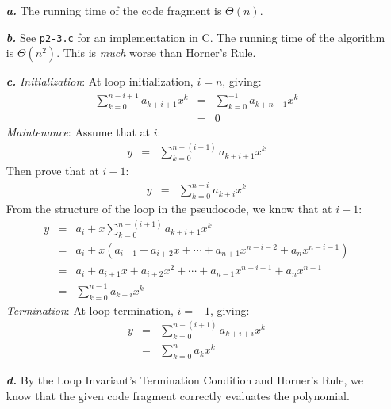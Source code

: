 \noindent\begin{enumerate}
	\item[\textbf{\textit{a.}}]
		The running time of the code fragment is $\Theta(n)$.

	\item[\textbf{\textit{b.}}]
		See \texttt{p2-3.c} for an implementation in C. The running time of the algorithm is $\Theta(n^2)$. This is \textit{much} worse than Horner's Rule.

	\item[\textbf{\textit{c.}}]
		\textit{Initialization}: At loop initialization, $i=n$, giving:
		\begin{eqnarray*}
			\sum_{k=0}^{n-i+1} a_{k+i+1} x^k & = & \sum_{k=0}^{-1} a_{k+n+1} x^k \\
			& = & 0
		\end{eqnarray*}
		\textit{Maintenance}: Assume that at $i$:
		\begin{eqnarray*}
			y & = & \sum_{k=0}^{n-(i+1)} a_{k+i+1} x^k
		\end{eqnarray*}
		Then prove that at $i-1$:
		\begin{eqnarray*}
			y & = & \sum_{k=0}^{n-i} a_{k+i} x^k
		\end{eqnarray*}
		From the structure of the loop in the pseudocode, we know that at $i-1$:
		\begin{eqnarray*}
			y & = & a_i + x \sum_{k=0}^{n-(i+1)} a_{k+i+1} x^k \\
			& = & a_i + x \left ( a_{i+1} + a_{i+2} x + \cdots + a_{n+1} x^{n-i-2} + a_n x^{n-i-1} \right ) \\
			& = & a_i + a_{i+1} x + a_{i+2} x^2 + \cdots + a_{n-1} x^{n-i-1} + a_n x^{n-1} \\
			& = & \sum_{k=0}^{n-1} a_{k+i} x^k
		\end{eqnarray*}
		\textit{Termination}: At loop termination, $i=-1$, giving:
		\begin{eqnarray*}
			y & = & \sum_{k=0}^{n-(i+1)} a_{k+i+i} x^k \\
			& = & \sum_{k=0}^n a_k x^k
		\end{eqnarray*}

	\item[\textbf{\textit{d.}}] By the Loop Invariant's Termination Condition and Horner's Rule, we know that the given code fragment correctly evaluates the polynomial.
\end{enumerate}
